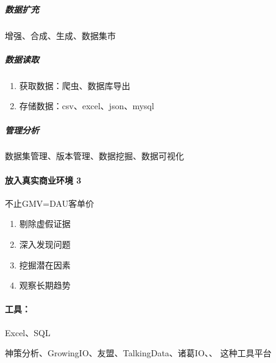 \documentclass[letterpaper,10pt,english]{sphinxmanual}
\begin{document}
\subparagraph{数据扩充}
\label{\detokenize{chapter_idea/data:id19}}
增强、合成、生成、数据集市


\subparagraph{数据读取}
\label{\detokenize{chapter_idea/data:id20}}\begin{enumerate}
%
\item {} 
获取数据：爬虫、数据库导出

\item {} 
存储数据：csv、excel、json、mysql
%
\begin{footnote}[387]\sphinxAtStartFootnote
{}
%
\end{footnote}

\end{enumerate}


\subparagraph{管理分析}
\label{\detokenize{chapter_idea/data:id21}}
数据集管理、版本管理、数据挖掘、数据可视化


\paragraph{放入真实商业环境 3\sphinxfootnotemark[388]}
\label{\detokenize{chapter_idea/data:id22}}%
\begin{footnotetext}[388]\sphinxAtStartFootnote
{}
%
\end{footnotetext}\ignorespaces 
不止GMV=DAU客单价
\begin{enumerate}
%
\item {} 
剔除虚假证据

\item {} 
深入发现问题

\item {} 
挖掘潜在因素

\item {} 
观察长期趋势

\end{enumerate}


\paragraph{工具：}
\label{\detokenize{chapter_idea/data:id23}}
Excel、SQL

神策分析、GrowingIO、友盟、TalkingData、诸葛IO、、
这种工具平台
\end{document}
